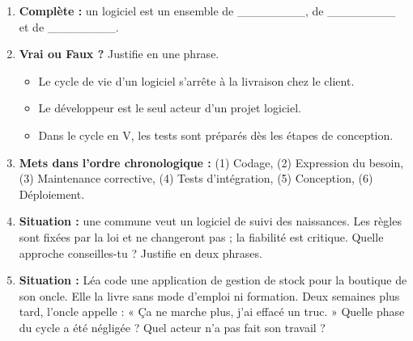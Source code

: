 \documentclass[11pt]{article}
\begin{document}
\begin{exercice}
\begin{enumerate}
    \item \textbf{Complète :} un logiciel est un ensemble de \_\_\_\_\_\_\_\_, de \_\_\_\_\_\_\_\_ et de \_\_\_\_\_\_\_\_.
    \item \textbf{Vrai ou Faux ?} Justifie en une phrase.
    \begin{itemize}
        \item[a)] Le cycle de vie d'un logiciel s'arrête à la livraison chez le client.
        \item[b)] Le développeur est le seul acteur d'un projet logiciel.
        \item[c)] Dans le cycle en V, les tests sont préparés dès les étapes de conception.
    \end{itemize}
    \item \textbf{Mets dans l'ordre chronologique :} (1) Codage, (2) Expression du besoin, (3) Maintenance corrective, (4) Tests d'intégration, (5) Conception, (6) Déploiement.
    \item \textbf{Situation :} une commune veut un logiciel de suivi des naissances. Les règles sont fixées par la loi et ne changeront pas ; la fiabilité est critique. Quelle approche conseilles-tu ? Justifie en deux phrases.
    \item \textbf{Situation :} Léa code une application de gestion de stock pour la boutique de son oncle. Elle la livre sans mode d'emploi ni formation. Deux semaines plus tard, l'oncle appelle : « Ça ne marche plus, j'ai effacé un truc. » Quelle phase du cycle a été négligée ? Quel acteur n'a pas fait son travail ?
\end{enumerate}
\end{exercice}
\end{document}
